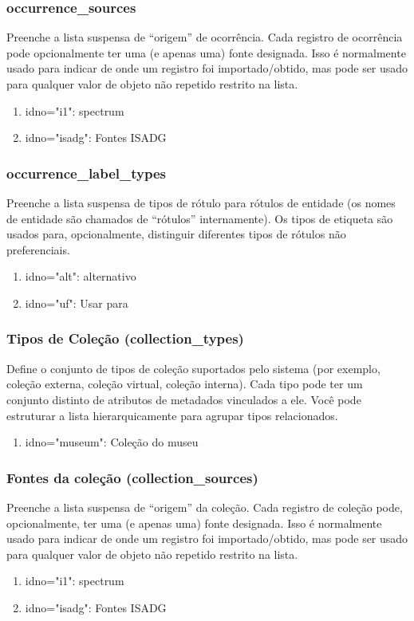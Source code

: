 \subsubsection{occurrence\_sources}

Preenche a lista suspensa de ``origem'' de ocorrência. Cada registro de ocorrência pode opcionalmente ter uma (e apenas uma) fonte designada. Isso é normalmente usado para indicar de onde um registro foi importado/obtido, mas pode ser usado para qualquer valor de objeto não repetido restrito na lista.
\begin{enumerate}
	\item idno="i1": spectrum
	\item idno="isadg": Fontes ISADG
\end{enumerate}

\subsubsection{occurrence\_label\_types}
Preenche a lista suspensa de tipos de rótulo para rótulos de entidade (os nomes de entidade são chamados de ``rótulos'' internamente). Os tipos de etiqueta são usados para, opcionalmente, distinguir diferentes tipos de rótulos não preferenciais.

\begin{enumerate}
	\item idno="alt": alternativo
	\item idno="uf": Usar para
\end{enumerate}

\subsubsection{Tipos de Coleção (collection\_types)}
Define o conjunto de tipos de coleção suportados pelo sistema (por exemplo, coleção externa, coleção virtual, coleção interna). Cada tipo pode ter um conjunto distinto de atributos de metadados vinculados a ele. Você pode estruturar a lista hierarquicamente para agrupar tipos relacionados.
\begin{enumerate}
	\item idno="museum": Coleção do museu
\end{enumerate}

\subsubsection{Fontes da coleção (collection\_sources)}
Preenche a lista suspensa de ``origem'' da coleção. Cada registro de coleção pode, opcionalmente, ter uma (e apenas uma) fonte designada. Isso é normalmente usado para indicar de onde um registro foi importado/obtido, mas pode ser usado para qualquer valor de objeto não repetido restrito na lista.
\begin{enumerate}
	\item idno="i1": spectrum
	\item idno="isadg": Fontes ISADG
\end{enumerate}

